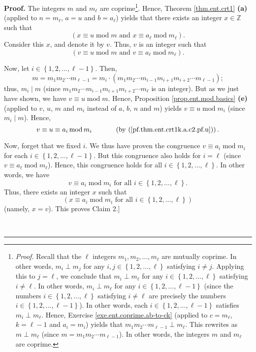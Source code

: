\documentclass[numbers=enddot,12pt,final,onecolumn,notitlepage]{scrartcl}%
\numberwithin{exer}{subsection}
\theoremstyle{definition}
\newenvironment{proof}[1][Proof]{\noindent\textbf{#1.} }{\ \rule{0.5em}{0.5em}}
\begin{document}
\begin{proof}
The integers $m$ and $m_{\ell}$ are coprime\footnote{\textit{Proof.} Recall
that the $\ell$ integers $m_{1},m_{2},\ldots,m_{\ell}$ are mutually coprime.
In other words, $m_{i}\perp m_{j}$ for any $i,j\in\left\{  1,2,\ldots
,\ell\right\}  $ satisfying $i\neq j$. Applying this to $j=\ell$, we conclude
that $m_{i}\perp m_{\ell}$ for any $i\in\left\{  1,2,\ldots,\ell\right\}  $
satisfying $i\neq\ell$. In other words, $m_{i}\perp m_{\ell}$ for any
$i\in\left\{  1,2,\ldots,\ell-1\right\}  $ (since the numbers $i\in\left\{
1,2,\ldots,\ell\right\}  $ satisfying $i\neq\ell$ are precisely the numbers
$i\in\left\{  1,2,\ldots,\ell-1\right\}  $). In other words, each
$i\in\left\{  1,2,\ldots,\ell-1\right\}  $ satisfies $m_{i}\perp m_{\ell}$.
Hence, Exercise \ref{exe.ent.coprime.ab-to-ck} (applied to $c=m_{\ell}$,
$k=\ell-1$ and $a_{i}=m_{i}$) yields that $m_{1}m_{2}\cdots m_{\ell-1}\perp
m_{\ell}$. This rewrites as $m\perp m_{\ell}$ (since $m=m_{1}m_{2}\cdots
m_{\ell-1}$). In other words, the integers $m$ and $m_{\ell}$ are coprime.}.
Hence, Theorem \ref{thm.ent.crt1} \textbf{(a)} (applied to $n=m_{\ell}$, $a=u$
and $b=a_{\ell}$) yields that there exists an integer $x\in\mathbb{Z}$ such
that%
\[
\left(  x\equiv u\operatorname{mod}m\text{ and }x\equiv a_{\ell}%
\operatorname{mod}m_{\ell}\right)  .
\]
Consider this $x$, and denote it by $v$. Thus, $v$ is an integer such that%
\[
\left(  v\equiv u\operatorname{mod}m\text{ and }v\equiv a_{\ell}%
\operatorname{mod}m_{\ell}\right)  .
\]


Now, let $i\in\left\{  1,2,\ldots,\ell-1\right\}  $. Then,
\[
m=m_{1}m_{2}\cdots m_{\ell-1}=m_{i}\cdot\left(  m_{1}m_{2}\cdots
m_{i-1}m_{i+1}m_{i+2}\cdots m_{\ell-1}\right)  ;
\]
thus, $m_{i}\mid m$ (since $m_{1}m_{2}\cdots m_{i-1}m_{i+1}m_{i+2}\cdots
m_{\ell}$ is an integer). But as we just have shown, we have $v\equiv
u\operatorname{mod}m$. Hence, Proposition \ref{prop.ent.mod.basics}
\textbf{(e)} (applied to $v$, $u$, $m$ and $m_{i}$ instead of $a$, $b$, $n$
and $m$) yields $v\equiv u\operatorname{mod}m_{i}$ (since $m_{i}\mid m$).
Hence,
\[
v\equiv u\equiv a_{i}\operatorname{mod}m_{i}\ \ \ \ \ \ \ \ \ \ \left(
\text{by (\ref{pf.thm.ent.crt1k.a.c2.pf.u})}\right)  .
\]


Now, forget that we fixed $i$. We thus have proven the congruence $v\equiv
a_{i}\operatorname{mod}m_{i}$ for each $i\in\left\{  1,2,\ldots,\ell
-1\right\}  $. But this congruence also holds for $i=\ell$ (since $v\equiv
a_{\ell}\operatorname{mod}m_{\ell}$). Hence, this congruence holds for all
$i\in\left\{  1,2,\ldots,\ell\right\}  $. In other words, we have%
\[
v\equiv a_{i}\operatorname{mod}m_{i}\text{ for all }i\in\left\{
1,2,\ldots,\ell\right\}  \text{.}%
\]
Thus, there exists an integer $x$ such that
\[
\left(  x\equiv a_{i}\operatorname{mod}m_{i}\text{ for all }i\in\left\{
1,2,\ldots,\ell\right\}  \right)
\]
(namely, $x=v$). This proves Claim 2.]


\end{proof}
\end{document}
